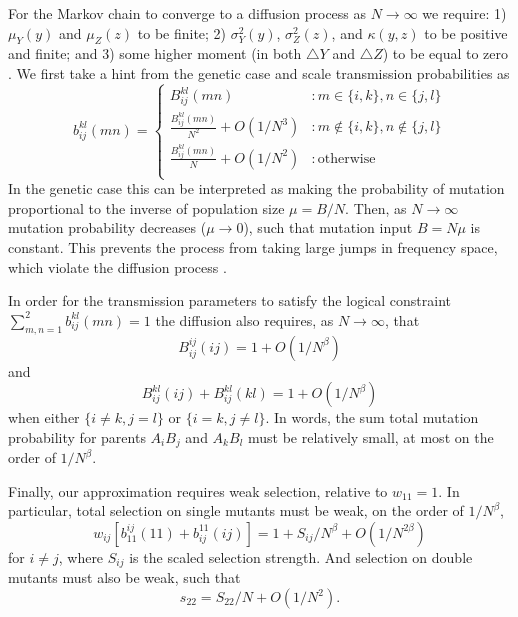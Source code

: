 \documentclass[review,3p,authoryear]{elsarticle}
\begin{document}
\begin{appendices}
For the Markov chain to converge to a diffusion process as $N \rightarrow \infty$ we require: 1) $\mu_Y(y)$ and $\mu_Z(z)$ to be finite; 2) $\sigma_Y^2(y)$, $\sigma_Z^2(z)$, and $\kappa (y,z)$ to be positive and finite; and 3) some higher moment (in both $\triangle Y$ and $\triangle Z$) to be equal to zero \citep{Karlin1981book}.
We first take a hint from the genetic case \citep{Christiansen1998} and scale transmission probabilities as
\begin{equation}\label{App:scaleb}
   b_{ij}^{kl}(mn) = \left\{
     \begin{array}{ll}
       B_{ij}^{kl}(mn) & : m \in \{i,k\}, n \in \{j,l\} \\
       \frac{B_{ij}^{kl}(mn)}{N^2} + O(1/N^3) & : m \not\in \{i,k\}, n \not\in \{j,l\} \\ 
       \frac{B_{ij}^{kl}(mn)}{N} + O(1/N^2) & : \mathrm{otherwise} \\
      \end{array}
   \right.
\end{equation} 
In the genetic case this can be interpreted as making the probability of mutation proportional to the inverse of population size $\mu=B/N$. 
Then, as $N\rightarrow\infty$ mutation probability decreases ($\mu\rightarrow0$), such that mutation input $B = N\mu$ is constant.
This prevents the process from taking large jumps in frequency space, which violate the diffusion process \citep{Karlin1981book}.

In order for the transmission parameters to satisfy the logical constraint $\sum_{m,n=1}^{2}b_{ij}^{kl}(mn)=1$ the diffusion also requires, as $N\rightarrow\infty$, that
\begin{equation}\label{App:mut}
B_{ij}^{ij}(ij) = 1 + O(1/N^{\beta}) 
\end{equation}
and
\begin{equation}
B_{ij}^{kl}(ij) + B_{ij}^{kl}(kl) = 1 + O(1/N^{\beta}) 
\end{equation}
when either $\{i\neq k,j=l\}$ or $\{i=k,j\neq l\}$.
In words, the sum total mutation probability for parents $A_iB_j$ and $A_kB_l$ must be relatively small, at most on the order of $1/N^\beta$.

Finally, our approximation requires weak selection, relative to $w_{11}=1$.
In particular, total selection on single mutants must be weak, on the order of $1/N^\beta$,
\begin{equation}\label{App:scalem}
w_{ij}[b_{11}^{ij}(11)+b_{ij}^{11}(ij)] = 1 + S_{ij}/N^\beta + O(1/N^{2\beta})
\end{equation}
for $i\neq j$, where $S_{ij}$ is the scaled selection strength.
And selection on double mutants must also be weak, such that
\begin{equation}\label{App:scales22}
s_{22} = S_{22}/N + O(1/N^2).
\end{equation}


\end{appendices}
\end{document}
